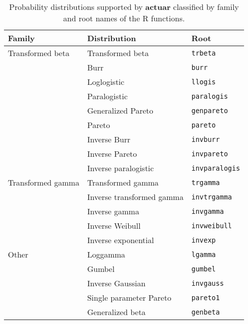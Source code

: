 \documentclass[x11names]{article}
\newcommand{\proglang}[1]{\textsf{#1}}
\newcommand{\pkg}[1]{\textbf{#1}}
\newcommand{\code}[1]{\texttt{#1}}
\begin{document}
\begin{table}
  \centering
  \begin{tabular}{lll}
    \toprule
    Family & Distribution & Root \\
    \midrule
    Transformed beta  & Transformed beta & \code{trbeta} \\
                      & Burr & \code{burr} \\
                      & Loglogistic & \code{llogis} \\
                      & Paralogistic & \code{paralogis} \\
                      & Generalized Pareto & \code{genpareto} \\
                      & Pareto & \code{pareto} \\
                      & Inverse Burr & \code{invburr} \\
                      & Inverse Pareto & \code{invpareto} \\
                      & Inverse paralogistic & \code{invparalogis} \\
    \midrule
    Transformed gamma & Transformed gamma & \code{trgamma} \\
                      & Inverse transformed gamma & \code{invtrgamma} \\
                      & Inverse gamma & \code{invgamma} \\
                      & Inverse Weibull & \code{invweibull} \\
                      & Inverse exponential & \code{invexp} \\
    \midrule
    Other             & Loggamma & \code{lgamma} \\
                      & Gumbel & \code{gumbel} \\
                      & Inverse Gaussian & \code{invgauss} \\
                      & Single parameter Pareto & \code{pareto1} \\
                      & Generalized beta & \code{genbeta} \\
    \bottomrule
  \end{tabular}
  \caption{Probability distributions supported by \pkg{actuar}
    classified by family and root names of the \proglang{R}
    functions.}
  \label{tab:continuous}
\end{table}
\end{document}
